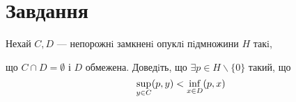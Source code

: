 
\chapter{Завдання \theHchapter}


\begin{tcolorbox}[title=Завдання]
    
    Нехай $C, D$ — непорожнi замкненi опуклi пiдмножини 
    $H$ такi, 
    
    
    що $ C \cap D = \emptyset$ і $D$ обмежена.
    Доведiть, що $ \exists p \in H \backslash \{0\} $
    такий, що
    $$ \displaystyle\sup_{y \in C} (p, y) < \displaystyle\inf_{x \in D} (p, x) $$

    
\end{tcolorbox}


